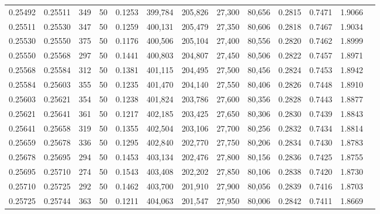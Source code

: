 \begin{tabular}{rrrrrrrrrrrrr}
0.25492 & 0.25511 &   349 &  50 &                                     0.1253 & 399,784 & 205,826 &  27,300 &  80,656 & 0.2815 & 0.7471 & 1.9066 \\
0.25511 & 0.25530 &   347 &  50 &                                     0.1259 & 400,131 & 205,479 &  27,350 &  80,606 & 0.2818 & 0.7467 & 1.9034 \\
0.25530 & 0.25550 &   375 &  50 &                                     0.1176 & 400,506 & 205,104 &  27,400 &  80,556 & 0.2820 & 0.7462 & 1.8999 \\
0.25550 & 0.25568 &   297 &  50 &                                     0.1441 & 400,803 & 204,807 &  27,450 &  80,506 & 0.2822 & 0.7457 & 1.8971 \\
0.25568 & 0.25584 &   312 &  50 &                                     0.1381 & 401,115 & 204,495 &  27,500 &  80,456 & 0.2824 & 0.7453 & 1.8942 \\
0.25584 & 0.25603 &   355 &  50 &                                     0.1235 & 401,470 & 204,140 &  27,550 &  80,406 & 0.2826 & 0.7448 & 1.8910 \\
0.25603 & 0.25621 &   354 &  50 &                                     0.1238 & 401,824 & 203,786 &  27,600 &  80,356 & 0.2828 & 0.7443 & 1.8877 \\
0.25621 & 0.25641 &   361 &  50 &                                     0.1217 & 402,185 & 203,425 &  27,650 &  80,306 & 0.2830 & 0.7439 & 1.8843 \\
0.25641 & 0.25658 &   319 &  50 &                                     0.1355 & 402,504 & 203,106 &  27,700 &  80,256 & 0.2832 & 0.7434 & 1.8814 \\
0.25659 & 0.25678 &   336 &  50 &                                     0.1295 & 402,840 & 202,770 &  27,750 &  80,206 & 0.2834 & 0.7430 & 1.8783 \\
0.25678 & 0.25695 &   294 &  50 &                                     0.1453 & 403,134 & 202,476 &  27,800 &  80,156 & 0.2836 & 0.7425 & 1.8755 \\
0.25695 & 0.25710 &   274 &  50 &                                     0.1543 & 403,408 & 202,202 &  27,850 &  80,106 & 0.2838 & 0.7420 & 1.8730 \\
0.25710 & 0.25725 &   292 &  50 &                                     0.1462 & 403,700 & 201,910 &  27,900 &  80,056 & 0.2839 & 0.7416 & 1.8703 \\
0.25725 & 0.25744 &   363 &  50 &                                     0.1211 & 404,063 & 201,547 &  27,950 &  80,006 & 0.2842 & 0.7411 & 1.8669 \\

\end{tabular}
